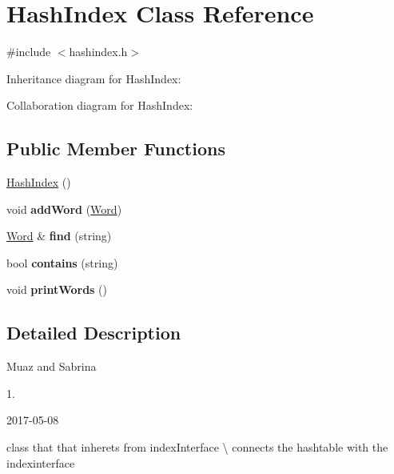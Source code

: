 \hypertarget{classHashIndex}{}\section{Hash\+Index Class Reference}
\label{classHashIndex}


{\ttfamily \#include $<$hashindex.\+h$>$}



Inheritance diagram for Hash\+Index\+:


Collaboration diagram for Hash\+Index\+:
\subsection*{Public Member Functions}
\begin{DoxyCompactItemize}
\item 
\hyperlink{classHashIndex_a28e8ea618f6315f451d9a046f49433f0}{Hash\+Index} ()
\item 
void {\bfseries add\+Word} (\hyperlink{classWord}{Word})\hypertarget{classHashIndex_ae8014827bf99c4e3ec063b92a113231d}{}\label{classHashIndex_ae8014827bf99c4e3ec063b92a113231d}

\item 
\hyperlink{classWord}{Word} \& {\bfseries find} (string)\hypertarget{classHashIndex_a470ba0f981a83f5309b7d20f229b438c}{}\label{classHashIndex_a470ba0f981a83f5309b7d20f229b438c}

\item 
bool {\bfseries contains} (string)\hypertarget{classHashIndex_a3ac4b6fb3d1a0e2b40627e7dd447f397}{}\label{classHashIndex_a3ac4b6fb3d1a0e2b40627e7dd447f397}

\item 
void {\bfseries print\+Words} ()\hypertarget{classHashIndex_a74e6395473fc09d1eb8196e0e884b575}{}\label{classHashIndex_a74e6395473fc09d1eb8196e0e884b575}

\end{DoxyCompactItemize}


\subsection{Detailed Description}
Muaz and Sabrina

1.

2017-\/05-\/08

class that that inherets from index\+Interface \textbackslash{} connects the hashtable with the indexinterface 

